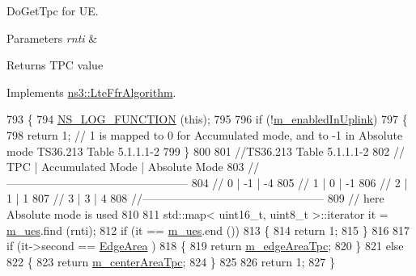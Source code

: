 Do\+Get\+Tpc for UE. 


\begin{DoxyParams}{Parameters}
{\em rnti} & \\
\hline
\end{DoxyParams}
\begin{DoxyReturn}{Returns}
T\+PC value 
\end{DoxyReturn}


Implements \hyperlink{classns3_1_1LteFfrAlgorithm_a1c58dea37b4812fcb2a817e3e1c45343}{ns3\+::\+Lte\+Ffr\+Algorithm}.


\begin{DoxyCode}
793 \{
794   \hyperlink{log-macros-disabled_8h_a90b90d5bad1f39cb1b64923ea94c0761}{NS\_LOG\_FUNCTION} (\textcolor{keyword}{this});
795 
796   \textcolor{keywordflow}{if} (!\hyperlink{classns3_1_1LteFfrAlgorithm_a6c681821267dfedf7083600005db4bee}{m\_enabledInUplink})
797     \{
798       \textcolor{keywordflow}{return} 1;     \textcolor{comment}{// 1 is mapped to 0 for Accumulated mode, and to -1 in Absolute mode TS36.213 Table
       5.1.1.1-2}
799     \}
800 
801   \textcolor{comment}{//TS36.213 Table 5.1.1.1-2}
802   \textcolor{comment}{//   TPC   |   Accumulated Mode  |  Absolute Mode}
803   \textcolor{comment}{//------------------------------------------------}
804   \textcolor{comment}{//    0    |         -1          |      -4}
805   \textcolor{comment}{//    1    |          0          |      -1}
806   \textcolor{comment}{//    2    |          1          |       1}
807   \textcolor{comment}{//    3    |          3          |       4}
808   \textcolor{comment}{//------------------------------------------------}
809   \textcolor{comment}{// here Absolute mode is used}
810 
811   std::map< uint16\_t, uint8\_t >::iterator it = \hyperlink{classns3_1_1LteFfrEnhancedAlgorithm_adac3233d5e9a87d83e6179f02f4f6d46}{m\_ues}.find (rnti);
812   \textcolor{keywordflow}{if} (it == \hyperlink{classns3_1_1LteFfrEnhancedAlgorithm_adac3233d5e9a87d83e6179f02f4f6d46}{m\_ues}.end ())
813     \{
814       \textcolor{keywordflow}{return} 1;
815     \}
816 
817   \textcolor{keywordflow}{if} (it->second == \hyperlink{classns3_1_1LteFfrEnhancedAlgorithm_a743d5d1934dc49e7c88a2850f624e6c3a2cb214dc1035d1d17b954464601f7a3e}{EdgeArea} )
818     \{
819       \textcolor{keywordflow}{return} \hyperlink{classns3_1_1LteFfrEnhancedAlgorithm_a7aeabe8a846be02adc93f8e08d5fd6b2}{m\_edgeAreaTpc};
820     \}
821   \textcolor{keywordflow}{else}
822     \{
823       \textcolor{keywordflow}{return} \hyperlink{classns3_1_1LteFfrEnhancedAlgorithm_a691a9031ef47da59d0bfbf4237b47cd6}{m\_centerAreaTpc};
824     \}
825 
826   \textcolor{keywordflow}{return} 1;
827 \}
\end{DoxyCode}
